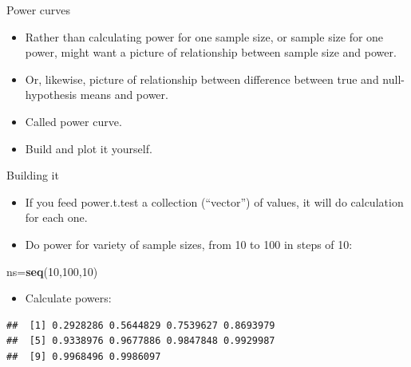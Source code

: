 \documentclass[ignorenonframetext,]{beamer}
\newenvironment{Shaded}{\begin{snugshade}}{\end{snugshade}}
\newcommand{\DataTypeTok}[1]{\textcolor[rgb]{0.13,0.29,0.53}{#1}}
\newcommand{\DecValTok}[1]{\textcolor[rgb]{0.00,0.00,0.81}{#1}}
\newcommand{\KeywordTok}[1]{\textcolor[rgb]{0.13,0.29,0.53}{\textbf{#1}}}
\newcommand{\NormalTok}[1]{#1}
\newcommand{\OperatorTok}[1]{\textcolor[rgb]{0.81,0.36,0.00}{\textbf{#1}}}
\newcommand{\StringTok}[1]{\textcolor[rgb]{0.31,0.60,0.02}{#1}}
\providecommand{\tightlist}{%
  \setlength{\itemsep}{0pt}\setlength{\parskip}{0pt}}
\begin{document}
\begin{frame}{Power curves}
\protect\hypertarget{power-curves}{}

\begin{itemize}
\tightlist
\item
  Rather than calculating power for one sample size, or sample size for
  one power, might want a picture of relationship between sample size
  and power.
\item
  Or, likewise, picture of relationship between difference between true
  and null-hypothesis means and power.
\item
  Called power curve.
\item
  Build and plot it yourself.
\end{itemize}

\end{frame}

\begin{frame}[fragile]{Building it}
\protect\hypertarget{building-it}{}

\begin{itemize}
\tightlist
\item
  If you feed power.t.test a collection (``vector'') of values, it will
  do calculation for each one.
\item
  Do power for variety of sample sizes, from 10 to 100 in steps of 10:
\end{itemize}

\begin{Shaded}
\begin{Highlighting}[]
\NormalTok{ns=}\KeywordTok{seq}\NormalTok{(}\DecValTok{10}\NormalTok{,}\DecValTok{100}\NormalTok{,}\DecValTok{10}\NormalTok{)}
\end{Highlighting}
\end{Shaded}

\begin{itemize}
\tightlist
\item
  Calculate powers:
\end{itemize}

\begin{Shaded}
\end{Shaded}

\begin{verbatim}
##  [1] 0.2928286 0.5644829 0.7539627 0.8693979
##  [5] 0.9338976 0.9677886 0.9847848 0.9929987
##  [9] 0.9968496 0.9986097
\end{verbatim}

\end{frame}
\end{document}

